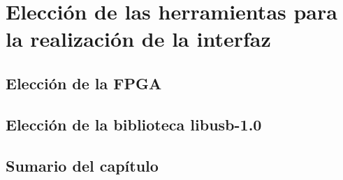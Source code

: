 \chapter{Elección de las herramientas para la realización de la interfaz}
	\label{cap:mats}
	
	\section{Elección de la FPGA}
		\label{mats:fpga}
		
	\section{Elección de la biblioteca libusb-1.0}
		
	\section{Sumario del capítulo}
		
	
%		
%		
%		
		